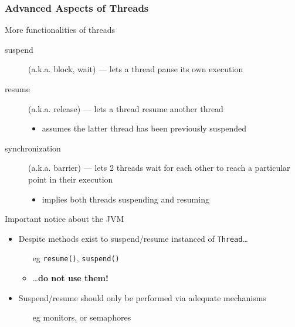 \documentclass[presentation]{beamer}\mode<presentation>{\usetheme{AMSBolognaFC}}
\begin{document}
\begin{frame}[allowframebreaks]
    \frametitle{Advanced Aspects of Threads}



    \begin{exampleblock}{More functionalities of threads}
        \begin{description}
            \item[suspend] (a.k.a. block, wait)  --- lets a thread pause its own execution

            \item[resume] (a.k.a. release) --- lets a thread resume another thread
            \begin{itemize}
                \item assumes the latter thread has been previously suspended
            \end{itemize}

            \item[synchronization] (a.k.a. barrier) --- lets 2 threads wait for each other to reach a particular point in their execution
            \begin{itemize}
                \item implies both threads suspending and resuming
            \end{itemize}
        \end{description}
    \end{exampleblock}

    \begin{alertblock}{Important notice about the JVM}
        \begin{itemize}
            \item Despite methods exist to suspend/resume instanced of \texttt{Thread}\ldots
            \begin{itemize}
                \item[eg] \texttt{resume()}, \texttt{suspend()}
                \item \ldots \textbf{do not use them!}
            \end{itemize}

            \item Suspend/resume should only be performed via adequate mechanisms
            \begin{itemize}
                \item[eg] monitors, or semaphores
            \end{itemize}


\end{itemize}
\end{alertblock}
\end{frame}
\end{document}
